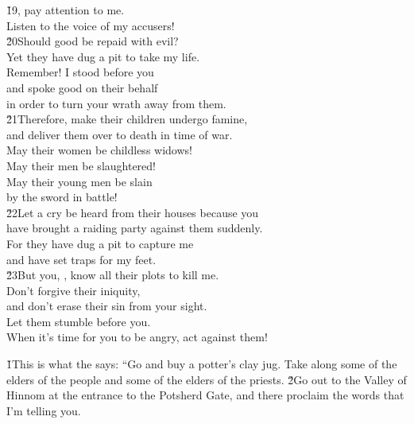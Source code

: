 \begin{poetry}
\poeml \v{19}, pay attention to me. \\
\poemll    Listen to the voice of my accusers! \\
\poeml \v{20}Should good be repaid with evil? \\
\poemll    Yet they have dug a pit to take my life. \\
\poeml Remember! I stood before you \\
\poemll    and spoke good on their behalf \\
\poemlll       in order to turn your wrath away from them. \\
\poeml \v{21}Therefore, make their children undergo famine, \\
\poemll    and deliver them over to death in time of war. \\
\poeml May their women be childless widows! \\
\poemll    May their men be slaughtered! \\
\poeml May their young men be slain \\
\poemll    by the sword in battle! \\
\poeml \v{22}Let a cry be heard from their houses because you \\
\poemll    have brought a raiding party against them suddenly. \\
\poeml For they have dug a pit to capture me \\
\poemll    and have set traps for my feet. \\
\poeml \v{23}But you, , know all their plots to kill me. \\
\poemll    Don't forgive their iniquity, \\
\poemll    and don't erase their sin from your sight. \\
\poeml Let them stumble before you. \\
\poemll    When it's time for you to be angry, act against them!
\end{poetry}

\v{1}This is what the  says: ``Go and buy a potter's clay jug. Take along some of the elders of the people and some of the elders of the priests. \v{2}Go out to the Valley of Hinnom at the entrance to the Potsherd Gate, and there proclaim the words that I'm telling you.

